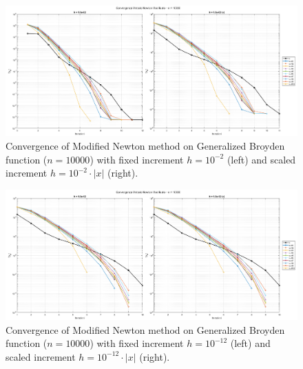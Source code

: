 \documentclass[a4paper,12pt]{article}
\begin{document}
\begin{itemize}
	
	\begin{figure}[htbp]
		\centering
		\includegraphics[width=\textwidth]{../immagini/broyden_10k_h2.png}
		\caption{Convergence of Modified Newton method on Generalized Broyden function ($n=10000$) with fixed increment $h = 10^{-2}$ (left) and scaled increment $h = 10^{-2}\cdot|x|$ (right).}
		\label{fig:fd_broyden_10k_h2}
	\end{figure}
	
	\begin{figure}[htbp]
		\centering
		\includegraphics[width=\textwidth]{../immagini/broyden_10k_h12.png}
		\caption{Convergence of Modified Newton method on Generalized Broyden function ($n=10000$) with fixed increment $h = 10^{-12}$ (left) and scaled increment $h = 10^{-12}\cdot|x|$ (right).}
		\label{fig:fd_broyden_10k_h12}
	\end{figure}
	\newpage
	

\end{itemize}
\end{document}
